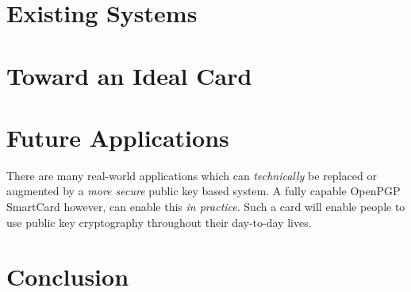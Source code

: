 \documentclass[11pt, twocolumn]{article}
\begin{document}
\section{Existing Systems}
\label{sec:exisitng}

\section{Toward an Ideal Card}
\label{sec:ideal}

\section{Future Applications}
\label{sec:future}

There are many real-world applications which can \textit{technically} be
replaced or augmented by a \textit{more secure} public key based system. A fully
capable OpenPGP SmartCard however, can enable this \textit{in practice}. Such a
card will enable people to use public key cryptography throughout their
day-to-day lives.

\section{Conclusion}
\label{sec:conclusion}


\nocite{*}

\end{document}
